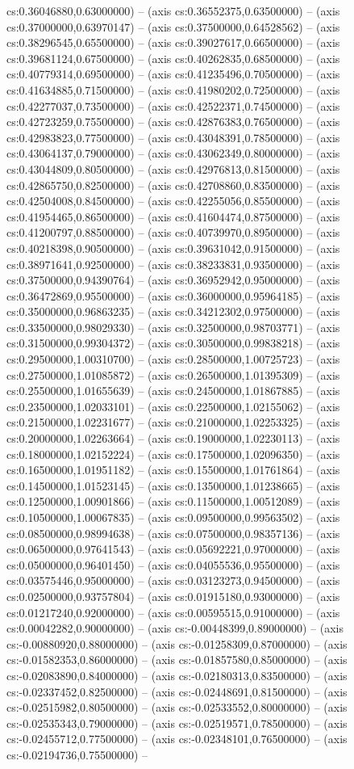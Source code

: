 cs:0.36046880,0.63000000) -- (axis cs:0.36552375,0.63500000) -- (axis cs:0.37000000,0.63970147) -- (axis cs:0.37500000,0.64528562) -- (axis cs:0.38296545,0.65500000) -- (axis cs:0.39027617,0.66500000) -- (axis cs:0.39681124,0.67500000) -- (axis cs:0.40262835,0.68500000) -- (axis cs:0.40779314,0.69500000) -- (axis cs:0.41235496,0.70500000) -- (axis cs:0.41634885,0.71500000) -- (axis cs:0.41980202,0.72500000) -- (axis cs:0.42277037,0.73500000) -- (axis cs:0.42522371,0.74500000) -- (axis cs:0.42723259,0.75500000) -- (axis cs:0.42876383,0.76500000) -- (axis cs:0.42983823,0.77500000) -- (axis cs:0.43048391,0.78500000) -- (axis cs:0.43064137,0.79000000) -- (axis cs:0.43062349,0.80000000) -- (axis cs:0.43044809,0.80500000) -- (axis cs:0.42976813,0.81500000) -- (axis cs:0.42865750,0.82500000) -- (axis cs:0.42708860,0.83500000) -- (axis cs:0.42504008,0.84500000) -- (axis cs:0.42255056,0.85500000) -- (axis cs:0.41954465,0.86500000) -- (axis cs:0.41604474,0.87500000) -- (axis cs:0.41200797,0.88500000) -- (axis cs:0.40739970,0.89500000) -- (axis cs:0.40218398,0.90500000) -- (axis cs:0.39631042,0.91500000) -- (axis cs:0.38971641,0.92500000) -- (axis cs:0.38233831,0.93500000) -- (axis cs:0.37500000,0.94390764) -- (axis cs:0.36952942,0.95000000) -- (axis cs:0.36472869,0.95500000) -- (axis cs:0.36000000,0.95964185) -- (axis cs:0.35000000,0.96863235) -- (axis cs:0.34212302,0.97500000) -- (axis cs:0.33500000,0.98029330) -- (axis cs:0.32500000,0.98703771) -- (axis cs:0.31500000,0.99304372) -- (axis cs:0.30500000,0.99838218) -- (axis cs:0.29500000,1.00310700) -- (axis cs:0.28500000,1.00725723) -- (axis cs:0.27500000,1.01085872) -- (axis cs:0.26500000,1.01395309) -- (axis cs:0.25500000,1.01655639) -- (axis cs:0.24500000,1.01867885) -- (axis cs:0.23500000,1.02033101) -- (axis cs:0.22500000,1.02155062) -- (axis cs:0.21500000,1.02231677) -- (axis cs:0.21000000,1.02253325) -- (axis cs:0.20000000,1.02263664) -- (axis cs:0.19000000,1.02230113) -- (axis cs:0.18000000,1.02152224) -- (axis cs:0.17500000,1.02096350) -- (axis cs:0.16500000,1.01951182) -- (axis cs:0.15500000,1.01761864) -- (axis cs:0.14500000,1.01523145) -- (axis cs:0.13500000,1.01238665) -- (axis cs:0.12500000,1.00901866) -- (axis cs:0.11500000,1.00512089) -- (axis cs:0.10500000,1.00067835) -- (axis cs:0.09500000,0.99563502) -- (axis cs:0.08500000,0.98994638) -- (axis cs:0.07500000,0.98357136) -- (axis cs:0.06500000,0.97641543) -- (axis cs:0.05692221,0.97000000) -- (axis cs:0.05000000,0.96401450) -- (axis cs:0.04055536,0.95500000) -- (axis cs:0.03575446,0.95000000) -- (axis cs:0.03123273,0.94500000) -- (axis cs:0.02500000,0.93757804) -- (axis cs:0.01915180,0.93000000) -- (axis cs:0.01217240,0.92000000) -- (axis cs:0.00595515,0.91000000) -- (axis cs:0.00042282,0.90000000) -- (axis cs:-0.00448399,0.89000000) -- (axis cs:-0.00880920,0.88000000) -- (axis cs:-0.01258309,0.87000000) -- (axis cs:-0.01582353,0.86000000) -- (axis cs:-0.01857580,0.85000000) -- (axis cs:-0.02083890,0.84000000) -- (axis cs:-0.02180313,0.83500000) -- (axis cs:-0.02337452,0.82500000) -- (axis cs:-0.02448691,0.81500000) -- (axis cs:-0.02515982,0.80500000) -- (axis cs:-0.02533552,0.80000000) -- (axis cs:-0.02535343,0.79000000) -- (axis cs:-0.02519571,0.78500000) -- (axis cs:-0.02455712,0.77500000) -- (axis cs:-0.02348101,0.76500000) -- (axis cs:-0.02194736,0.75500000) -- 